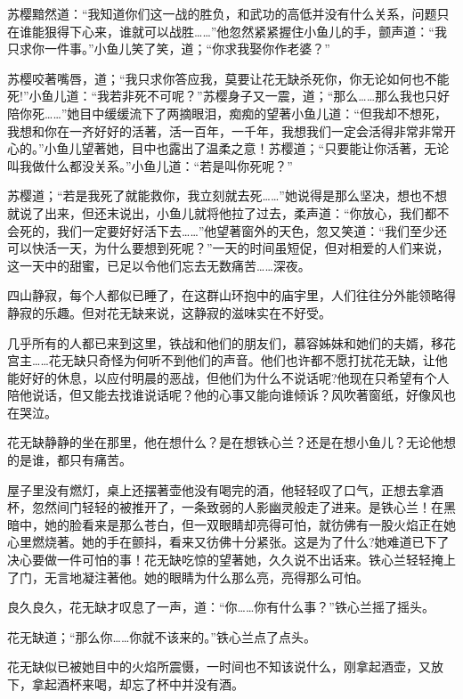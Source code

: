 \documentclass[12pt,oneside]{book}
\begin{document}
苏樱黯然道：``我知道你们这一战的胜负，和武功的高低并没有什么关系，问题只在谁能狠得下心来，谁就可以战胜\ldots\ldots{}''他忽然紧紧握住小鱼儿的手，颤声道：``我只求你一件事。''小鱼儿笑了笑，道；``你求我娶你作老婆？''

苏樱咬著嘴唇，道；``我只求你答应我，莫要让花无缺杀死你，你无论如何也不能死!''小鱼儿道：``我若非死不可呢？''苏樱身子又一震，道；``那么\ldots\ldots 那么我也只好陪你死\ldots\ldots{}''她目中缓缓流下了两摘眼泪，痴痴的望著小鱼儿道：``但我却不想死，我想和你在一齐好好的活著，活一百年，一千年，我想我们一定会活得非常非常开心的。''小鱼儿望著她，目中也露出了温柔之意！苏樱道；``只要能让你活著，无论叫我做什么都没关系。''小鱼儿道：``若是叫你死呢？''

苏樱道；``若是我死了就能救你，我立刻就去死\ldots\ldots{}''她说得是那么坚决，想也不想就说了出来，但还末说出，小鱼儿就将他拉了过去，柔声道：``你放心，我们都不会死的，我们一定要好好活下去\ldots\ldots{}''他望著窗外的天色，忽又笑道：``我们至少还可以快活一天，为什么要想到死呢？''一天的时间虽短促，但对相爱的人们来说，这一天中的甜蜜，已足以令他们忘去无数痛苦\ldots\ldots 深夜。

四山静寂，每个人都似已睡了，在这群山环抱中的庙宇里，人们往往分外能领略得静寂的乐趣。但对花无缺来说，这静寂的滋味实在不好受。

几乎所有的人都已来到这里，铁战和他们的朋友们，慕容姊妹和她们的夫婿，移花宫主\ldots\ldots 花无缺只奇怪为何听不到他们的声音。他们也许都不愿打扰花无缺，让他能好好的休息，以应付明晨的恶战，但他们为什么不说话呢?他现在只希望有个人陪他说话，但又能去找谁说话呢？他的心事又能向谁倾诉？风吹著窗纸，好像风也在哭泣。

花无缺静静的坐在那里，他在想什么？是在想铁心兰？还是在想小鱼儿？无论他想的是谁，都只有痛苦。

屋子里没有燃灯，桌上还摆著壶他没有喝完的酒，他轻轻叹了口气，正想去拿酒杯，忽然间门轻轻的被推开了，一条致弱的人影幽灵般走了进来。是铁心兰！在黑暗中，她的脸看来是那么苍白，但一双眼睛却亮得可怕，就彷佛有一股火焰正在她心里燃烧著。她的手在颤抖，看来又彷佛十分紧张。这是为了什么?她难道已下了决心要做一件可怕的事！花无缺吃惊的望著她，久久说不出话来。铁心兰轻轻掩上了门，无言地凝注著他。她的眼睛为什么那么亮，亮得那么可怕。

良久良久，花无缺才叹息了一声，道：``你\ldots\ldots 你有什么事？''铁心兰摇了摇头。

花无缺道；``那么你\ldots\ldots 你就不该来的。''铁心兰点了点头。

花无缺似已被她目中的火焰所震慑，一时间也不知该说什么，刚拿起酒壶，又放下，拿起酒杯来喝，却忘了杯中并没有酒。
\end{document}
